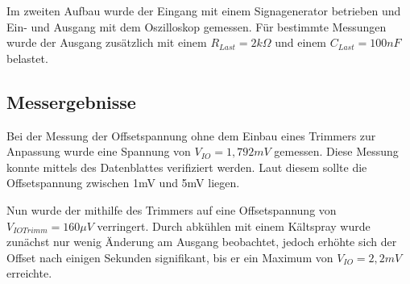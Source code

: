 Im zweiten Aufbau wurde der Eingang mit einem Signagenerator betrieben und Ein- und Ausgang mit dem Oszilloskop gemessen. Für bestimmte Messungen wurde der Ausgang zusätzlich mit einem $R_{Last} = 2k\Omega$ und einem $C_{Last} = 100nF$ belastet.


\subsection{Messergebnisse}
Bei der Messung der Offsetspannung ohne dem Einbau eines Trimmers zur Anpassung wurde eine Spannung von $V_{IO} = 1,792 mV$ gemessen. Diese Messung konnte mittels des Datenblattes verifiziert werden. Laut diesem sollte die Offsetspannung zwischen 1mV und 5mV liegen.\cite[6]{ti:ua741}

Nun wurde der mithilfe des Trimmers auf eine Offsetspannung von $V_{IO Trimm} = 160 \mu V$ verringert. Durch abkühlen mit einem Kältspray wurde zunächst nur wenig Änderung am Ausgang beobachtet, jedoch erhöhte sich der Offset nach einigen Sekunden signifikant, bis er ein Maximum von $V_{IO} = 2,2mV$ erreichte. 

